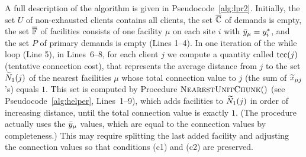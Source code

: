\documentclass[11pt]{article}
\begin{document}
A full description of the algorithm is given in
Pseudocode~\ref{alg:lpr2}.  Initially, the set $U$ of
non-exhausted clients contains all clients, the set
$\overline{\mathbb{C}}$ of demands is empty, the set $\overline{\mathbb{F}}$ of
facilities consists of one facility $\mu$ on each site $i$
with ${\bar y}_\mu = y^\ast_i$, and the set $P$ of primary
demands is empty (Lines 1--4).  In one iteration of the
while loop (Line 5), in Lines~6--8, for each client $j$ we
compute a quantity called $\textrm{tcc}(j)$ (tentative connection
cost), that represents the average distance from $j$ to the
set ${\widetilde N}_1(j)$ of the nearest facilities $\mu$ whose
total connection value to $j$ (the sum of ${\widetilde x}_{\mu
  j}$'s) equals $1$.  This set is computed by Procedure
${\textsc{NearestUnitChunk}}()$ (see Pseudocode~\ref{alg:helper},
Lines~1--9), which adds facilities to ${\widetilde N}_1(j)$ in
order of increasing distance, until the total connection
value is exactly $1$. (The procedure actually uses the
${\bar y}_\mu$ values, which are equal to the connection values
by completeness.)  This may require splitting the last added
facility and adjusting the connection values so that
conditions (c1) and (c2) are preserved.

\end{document}
